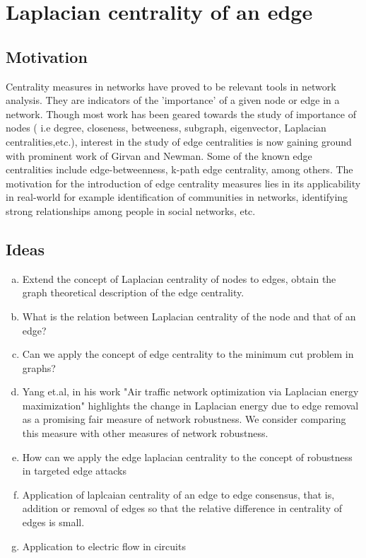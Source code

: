 \documentclass[10pt,a4paper]{article}
\begin{document}
	\section{Laplacian centrality of an edge}
	\subsection{Motivation}
	Centrality measures in networks have proved to be relevant tools in network analysis. They are indicators of the 'importance' of a given node or edge in a network. Though most work has been geared towards the study of importance of nodes ( i.e degree, closeness, betweeness, subgraph, eigenvector, Laplacian centralities,etc.), interest in the study of edge centralities is now gaining ground with prominent work of  Girvan and Newman. Some of the known edge centralities include edge-betweenness, k-path edge centrality, among others. The motivation for the introduction of edge centrality measures lies in its applicability in real-world for example identification of communities in networks, identifying strong relationships among people in social networks, etc. 
	\subsection{Ideas}
	\begin{enumerate}[a)]
		\item Extend the concept of Laplacian centrality of  nodes to edges, obtain the graph theoretical description of the edge centrality.
		\item What is the relation between Laplacian centrality of the node and that of an edge?
		\item Can we apply the concept of edge centrality to the minimum cut problem in graphs?
		\item Yang et.al, in his work "Air traffic network optimization via Laplacian energy maximization" highlights the change in Laplacian energy due to edge removal as a promising fair measure of network robustness. We consider comparing this measure with other measures of network robustness.
		\item How can we apply the edge laplacian centrality to the concept of robustness in targeted edge attacks
		\item Application of laplcaian centrality of an edge to edge consensus, that is, addition or removal of edges so that the relative difference in centrality of edges is small.
		\item Application to electric flow in circuits
	\end{enumerate}
	
\end{document}
